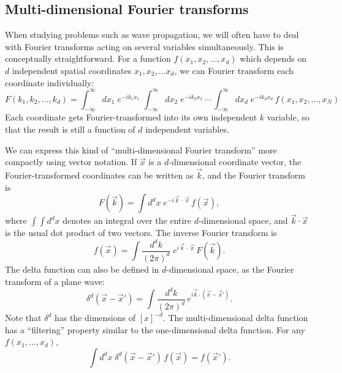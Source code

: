 \documentclass[10pt,a4paper]{article}
\begin{document}
\subsection{Multi-dimensional Fourier transforms}
\label{multi-dimensional-fourier-transforms}

When studying problems such as wave propagation, we will often have to
deal with Fourier transforms acting on several variables simultaneously.
This is conceptually straightforward. For a function
$f(x_1, x_2, \dots, x_d)$ which depends on $d$ independent spatial
coordinates $x_1, x_2, \dots x_d$, we can Fourier transform each
coordinate individually:
\begin{equation}
F(k_1, k_2, \dots, k_d) = \int_{-\infty}^\infty dx_1\; e^{-ik_1x_1}\; \int_{-\infty}^\infty dx_2\; e^{-ik_2x_2}\,\cdots\, \int_{-\infty}^\infty dx_d\; e^{-ik_d x_d}\, f(x_1,x_2, \dots,x_N)
\end{equation}
Each coordinate gets Fourier-transformed into its own independent $k$
variable, so that the result is still a function of $d$ independent
variables.

We can express this kind of ``multi-dimensional Fourier transform'' more
compactly using vector notation. If $\vec{x}$ is a $d$-dimensional
coordinate vector, the Fourier-transformed coordinates can be written as
$\vec{k}$, and the Fourier transform is
\begin{equation}
F(\vec{k}) = \int d^d x \; e^{-i\,\vec{k}\,\cdot\,\vec{x}}\, f(\vec{x}),
\end{equation}
where $\int \int d^d x$ denotes an integral over the entire
$d$-dimensional space, and $\vec{k}\cdot\vec{x}$ is the usual dot
product of two vectors. The inverse Fourier transform is
\begin{equation}
f(\vec{x}) = \int \frac{d^dk}{(2\pi)^d}\; e^{i\,\vec{k}\,\cdot\,\vec{x}}\, F(\vec{k}).
\end{equation}
The delta function can also be defined in $d$-dimensional space, as
the Fourier transform of a plane wave:
\begin{equation}
\delta^d(\vec{x}-\vec{x}') = \int \frac{d^dk}{(2\pi)^d} \, e^{i\vec{k} \cdot \left(\vec{x}-\vec{x}'\right)}.
\end{equation}
Note that $\delta^d$ has the dimensions of $[x]^{-d}$. The
multi-dimensional delta function has a ``filtering'' property similar
to the one-dimensional delta function. For any $f(x_1,\dots,x_d)$,
\begin{equation}
\int d^dx \; \delta^d(\vec{x}-\vec{x}') \, f(\vec{x}) = f(\vec{x}').
\end{equation}
\end{document}
